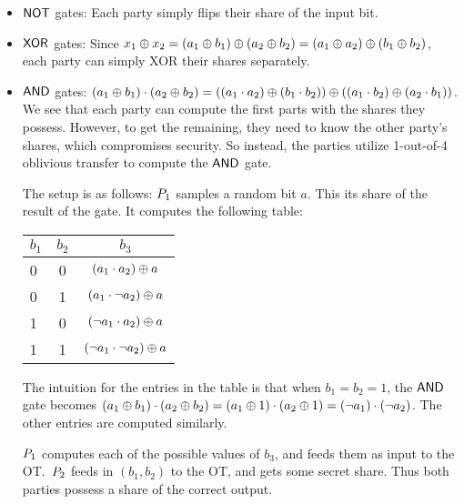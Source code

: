   \begin{itemize}%
    \item $\mathsf{NOT}$ gates: Each party simply flips their share of the input bit.

    \item $\mathsf{XOR}$ gates: Since $x_1 \oplus x_2 = (a_1 \oplus b_1) \oplus (a_2
      \oplus b_2) = (a_1 \oplus a_2) \oplus (b_1 \oplus b_2)$, each party can simply
      XOR their shares separately.

    \item $\mathsf{AND}$ gates: $(a_1 \oplus b_1)\cdot (a_2 \oplus b_2) = ((a_1 \cdot a_2) \oplus (b_1 \cdot b_2))
      \oplus ((a_1\cdot b_2) \oplus (a_2 \cdot b_1))$. We see that each party can
      compute the first parts with the shares they possess. However, to get the remaining,
      they need to know the other party's shares, which compromises security.
      So instead, the parties utilize 1-out-of-4 oblivious transfer to compute the
      $\mathsf{AND}$ gate.

      The setup is as follows: $P_1$ samples a random bit $a$. This its share
      of the result of the gate. It computes the following table:
      \begin{center}
        \begin{tabular}{lcc}
          \hline
          $b_1$ & $b_2$ & $b_3$\\
          \hline
          0   &   0   & $(a_1\cdot a_2)\oplus a$\\
          0   &   1   & $(a_1\cdot \neg a_2)\oplus a$\\
          1   &   0   & $(\neg a_1\cdot a_2)\oplus a$\\
          1   &   1   & $(\neg a_1\cdot \neg a_2)\oplus a$\\
          \hline
        \end{tabular}
      \end{center}
      The intuition for the entries in the table is that when $b_1 = b_2 = 1$,
      the $\mathsf{AND}$ gate becomes $(a_1 \oplus b_1)\cdot (a_2 \oplus b_2)  = (a_1 \oplus 1) \cdot (a_2 \oplus 1)
      = (\neg a_1)\cdot (\neg a_2)$. The other entries are computed similarly.

      $P_1$ computes each of the possible values of $b_3$, and feeds them as input
      to the OT.\ $P_2$ feeds in $(b_1, b_2)$ to the OT, and gets some secret
      share. Thus both parties possess a share of the correct output.
  \end{itemize}
